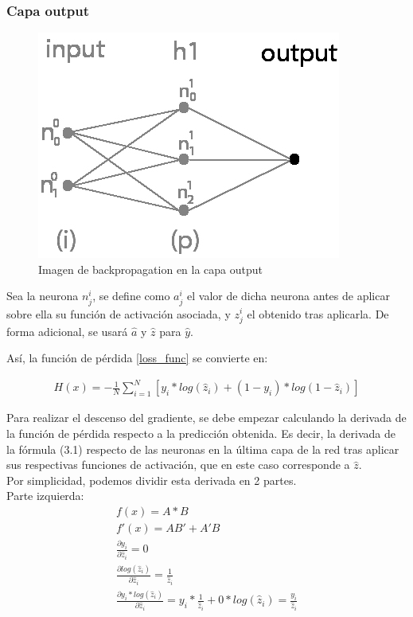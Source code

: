 \subsubsection{Capa output}

\begin{figure}[H]
	\centering
	\includegraphics[scale=0.35]{imagenes/nn_1_capa_output.jpg}  
	\caption{Imagen de backpropagation en la capa output}
	\label{fig:nn_1_capa_output}
\end{figure}

Sea la neurona $n^i_j$, se define como $a^i_j$ el valor de dicha neurona antes de aplicar sobre ella su función de activación asociada, y $z^i_j$ el obtenido tras aplicarla. De forma adicional, se usará $\hat{a}$ y $\hat{z}$ para $\hat{y}$.

Así, la función de pérdida \ref{loss_func} se convierte en:

\begin{gather}
	H(x) = - \frac{1}{N} \sum_{i=1}^{N}  [y_i * log( \hat{z}_i) + (1-y_i)*log(1-\hat{z}_i)]
	\label{loss_func_az}
\end{gather}

Para realizar el descenso del gradiente, se debe empezar calculando la derivada de la función de pérdida respecto a la predicción obtenida. Es decir, la derivada de la fórmula (3.1) respecto de las neuronas en la última capa de la red tras aplicar sus respectivas funciones de activación, que en este caso corresponde a $\hat{z}$. \\
Por simplicidad, podemos dividir esta derivada en 2 partes. \\
Parte izquierda:
\begin{gather}
	f(x) = A*B \\  
	f'(x) = AB' + A'B \\
	\frac{\partial y_i}{\partial \hat{z}_i} = 0 \\
	\frac{\partial log(\hat{z}_i)}{\partial \hat{z}_i} = \frac{1}{\hat{z}_i} \\
	\frac{\partial y_i * log( \hat{z}_i)}{\partial \hat{z}_i} = y_i*\frac{1}{\hat{z}_i} + 0*log(\hat{z}_i) = \frac{y_i}{\hat{z}_i}
\end{gather}

